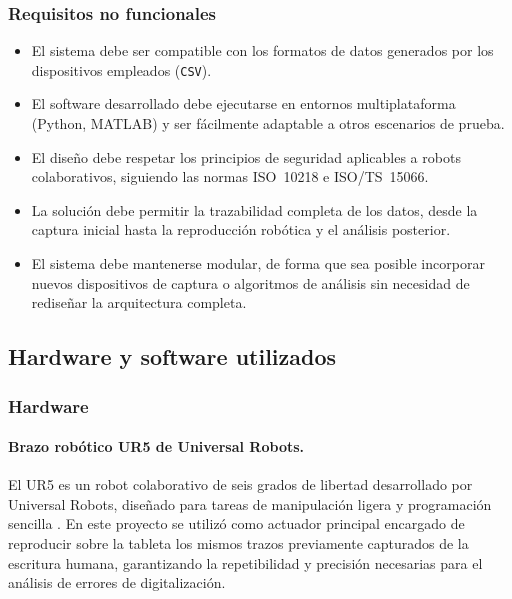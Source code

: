 \documentclass[12pt,a4paper,oneside]{report}
\begin{document}
\subsubsection*{Requisitos no funcionales}
\begin{itemize}
  \item El sistema debe ser compatible con los formatos de datos 
        generados por los dispositivos empleados (\texttt{CSV}).
  \item El software desarrollado debe ejecutarse en entornos 
        multiplataforma (Python, MATLAB) y ser fácilmente adaptable 
        a otros escenarios de prueba.
  \item El diseño debe respetar los principios de seguridad 
        aplicables a robots colaborativos, siguiendo las normas 
        ISO~10218 e ISO/TS~15066.
  \item La solución debe permitir la trazabilidad completa de los 
        datos, desde la captura inicial hasta la reproducción 
        robótica y el análisis posterior.
  \item El sistema debe mantenerse modular, de forma que sea 
        posible incorporar nuevos dispositivos de captura o 
        algoritmos de análisis sin necesidad de rediseñar la 
        arquitectura completa.
\end{itemize}


\subsection{Hardware y software utilizados}
\subsubsection{Hardware}
\paragraph{Brazo robótico \acrfull{UR5} de Universal Robots.}El \acrshort{UR5} es un robot colaborativo de seis grados de libertad desarrollado 
por Universal Robots, diseñado para tareas de manipulación ligera y programación sencilla \cite{ur5manual}. 
En este proyecto se utilizó como actuador principal encargado de reproducir sobre la tableta 
los mismos trazos previamente capturados de la escritura humana, garantizando la repetibilidad 
y precisión necesarias para el análisis de errores de digitalización.
\end{document}
